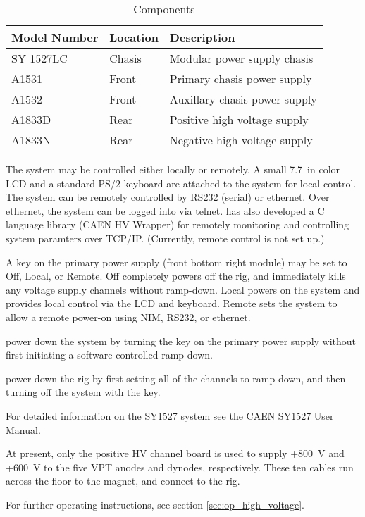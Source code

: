\begin{table}[htbp]\begin{center}
    \begin{tabular}{>{\ttfamily}l l l}
      \toprule
      \normalfont Model Number & Location & Description \\
      \midrule
      SY 1527LC & Chasis & Modular power supply chasis \\
      A1531 & Front & Primary chasis power supply \\
      A1532 & Front & Auxillary chasis power supply \\
      A1833D & Rear & Positive high voltage supply \\
      A1833N & Rear & Negative high voltage supply \\
      \bottomrule
    \end{tabular}
    \caption{ Components}
    \label{tab:eq_high_voltage:parts}
\end{center}\end{table}

The system may be controlled either locally or remotely.  A small 7.7~in color LCD and a standard PS/2 keyboard are attached to the system for local control.  The system can be remotely controlled by RS232 (serial) or ethernet.  Over ethernet, the system can be logged into via telnet.   has also developed a C language library (CAEN HV Wrapper) for remotely monitoring and controlling system paramters over TCP/IP.  (Currently, remote control is not set up.)

A key on the primary power supply (front bottom right module) may be set to Off, Local, or Remote.  Off completely powers off the rig, and immediately kills any voltage supply channels without ramp-down.  Local powers on the system and provides local control via the LCD and keyboard.  Remote sets the system to allow a remote power-on using NIM, RS232, or ethernet.

\begin{pleasedonot} power down the system by turning the key on the primary power supply without first initiating a software-controlled ramp-down.\end{pleasedonot}

\begin{pleasedo} power down the rig by first setting all of the channels to ramp down, and then turning off the system with the key.\end{pleasedo}

\noindent
For detailed information on the SY1527 system see the \href{Manuals/CAEN sy1527usermanual_rev15}{CAEN SY1527 User Manual}.

At present, only the positive HV channel board is used to supply +800~V and +600~V to the five VPT anodes and dynodes, respectively.  These ten cables run across the floor to the magnet, and connect to the rig.

For further operating instructions, see section \ref{sec:op_high_voltage}.

